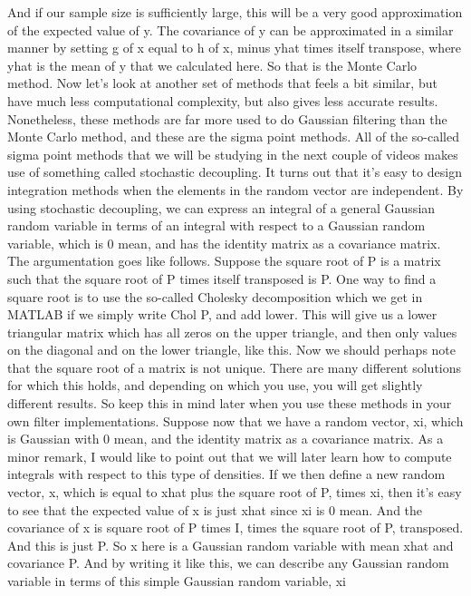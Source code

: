 And if our sample size is sufficiently large,
this will be a very good approximation
of the expected value of y.
The covariance of y can be approximated
in a similar manner by setting g of x
equal to h of x, minus yhat times itself transpose,
where yhat is the mean of y that we calculated here.
So that is the Monte Carlo method.
Now let's look at another set of methods
that feels a bit similar, but have much less
computational complexity, but also gives
less accurate results.
Nonetheless, these methods are far more
used to do Gaussian filtering than the Monte Carlo method,
and these are the sigma point methods.
All of the so-called sigma point methods
that we will be studying in the next couple of videos
makes use of something called stochastic decoupling.
It turns out that it's easy to design integration methods when
the elements in the random vector are independent.
By using stochastic decoupling, we
can express an integral of a general Gaussian
random variable in terms of an integral
with respect to a Gaussian random variable, which
is 0 mean, and has the identity matrix as a covariance matrix.
The argumentation goes like follows.
Suppose the square root of P is a matrix
such that the square root of P times
itself transposed is P. One way to find a square root
is to use the so-called Cholesky decomposition which
we get in MATLAB if we simply write Chol P, and add lower.
This will give us a lower triangular matrix
which has all zeros on the upper triangle,
and then only values on the diagonal
and on the lower triangle, like this.
Now we should perhaps note that the square root of a matrix
is not unique.
There are many different solutions for which this holds,
and depending on which you use, you
will get slightly different results.
So keep this in mind later when you
use these methods in your own filter implementations.
Suppose now that we have a random vector, xi,
which is Gaussian with 0 mean, and the identity
matrix as a covariance matrix.
As a minor remark, I would like to point out
that we will later learn how to compute integrals with respect
to this type of densities.
If we then define a new random vector, x,
which is equal to xhat plus the square root of P,
times xi, then it's easy to see that the expected value of x is
just xhat since xi is 0 mean.
And the covariance of x is square root of P times I,
times the square root of P, transposed.
And this is just P.
So x here is a Gaussian random variable
with mean xhat and covariance P. And by writing it like this,
we can describe any Gaussian random variable
in terms of this simple Gaussian random variable, xi
